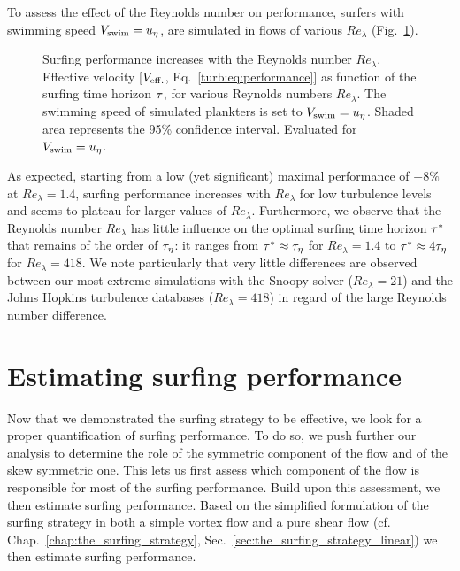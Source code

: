 To assess the effect of the Reynolds number on performance, surfers with swimming speed $V_{\mathrm{swim}} = u_{\eta}$, are simulated in flows of various $\mathit{Re}_{\lambda}$ (Fig.~\ref{fig:surfing_parameter_tau_reynolds}).
\begin{figure}%
	\centering
	
	\caption[Surfing performance increases with the Reynolds number $\mathit{Re}_{\lambda}$.]{
		Surfing performance increases with the Reynolds number $\mathit{Re}_{\lambda}$.
		Effective velocity [$V_{\mathrm{eff.}}$, Eq.~\eqref{turb:eq:performance}] as function of the surfing time horizon $\tau$, for various Reynolds numbers $\mathit{Re}_{\lambda}$.
		The swimming speed of simulated plankters is set to $V_{\mathrm{swim}} = u_{\eta}$.
		Shaded area represents the 95\% confidence interval.
		Evaluated for $V_{\mathrm{swim}} = u_{\eta}$.
	}
	\label{fig:surfing_parameter_tau_reynolds}
\end{figure}
As expected, starting from a low (yet significant) maximal performance of $+8\%$ at $\mathit{Re}_{\lambda} = 1.4$, surfing performance increases with $\mathit{Re}_{\lambda}$ for low turbulence levels and seems to plateau for larger values of $\mathit{Re}_{\lambda}$.
Furthermore, we observe that the Reynolds number $\mathit{Re}_{\lambda}$ has little influence on the optimal surfing time horizon $\tau^*$ that remains of the order of $\tau_{\eta}$: it ranges from $\tau^* \approx \tau_{\eta}$ for $\mathit{Re}_{\lambda} = 1.4$ to $\tau^* \approx 4\tau_{\eta}$ for $\mathit{Re}_{\lambda} = 418$.
We note particularly that very little differences are observed between our most extreme simulations with the Snoopy solver ($\mathit{Re}_{\lambda} = 21$) and the Johns Hopkins turbulence databases ($\mathit{Re}_{\lambda} = 418$) in regard of the large Reynolds number difference.

\section{Estimating surfing performance}\label{sec:estimating_surfing_performance}

Now that we demonstrated the surfing strategy to be effective, we look for a proper quantification of surfing performance.
To do so, we push further our analysis to determine the role of the symmetric component of the flow and of the skew symmetric one.
This lets us first assess which component of the flow is responsible for most of the surfing performance.
Build upon this assessment, we then estimate surfing performance.
Based on the simplified formulation of the surfing strategy in both a simple vortex flow and a pure shear flow (cf. Chap.~\ref{chap:the_surfing_strategy}, Sec.~\ref{sec:the_surfing_strategy_linear}) we then estimate surfing performance.

